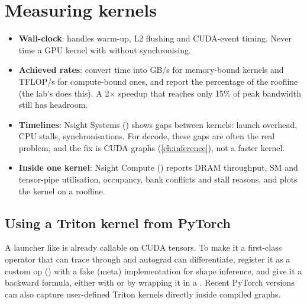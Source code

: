 \section{Measuring kernels}
\begin{itemize}
  \item \textbf{Wall-clock}:  handles warm-up, L2
        flushing and CUDA-event timing. Never time a GPU kernel with
         without synchronising.
  \item \textbf{Achieved rates}: convert time into GB/s for memory-bound kernels and TFLOP/s
        for compute-bound ones, and report the percentage of the roofline (the lab's
         does this). A 2$\times$ speedup that reaches only 15\% of peak
        bandwidth still has headroom.
  \item \textbf{Timelines}: Nsight Systems () shows gaps
        between kernels: launch overhead, CPU stalls, synchronisations. For decode, these
        gaps are often the real problem, and the fix is CUDA graphs (\cref{ch:inference}),
        not a faster kernel.
  \item \textbf{Inside one kernel}: Nsight Compute () reports DRAM
        throughput, SM and tensor-pipe utilisation, occupancy, bank conflicts and stall
        reasons, and plots the kernel on a roofline.
\end{itemize}

\subsection{Using a Triton kernel from PyTorch}
A launcher like  is already callable on CUDA tensors. To make it a
first-class operator that  can trace through and autograd can
differentiate, register it as a custom op () with a fake
(meta) implementation for shape inference, and give it a backward formula, either with
 or by wrapping it in a . Recent
PyTorch versions can also capture user-defined Triton kernels directly inside compiled
graphs.

